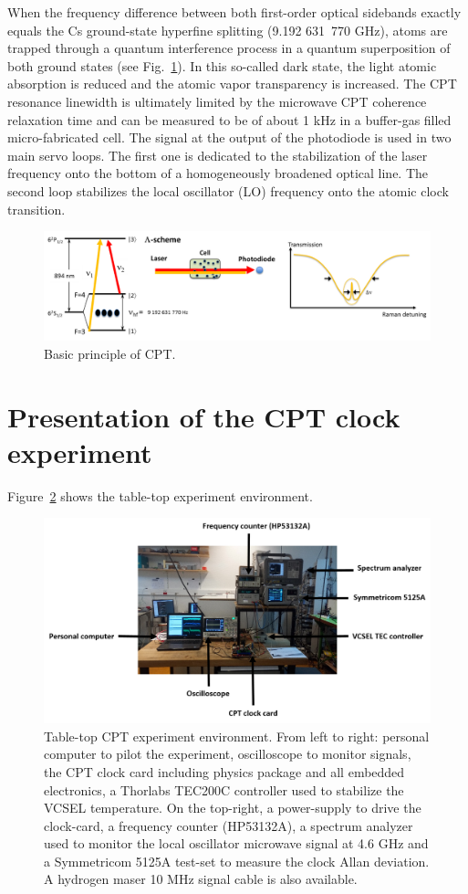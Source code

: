 \documentclass[a4paper,11pt]{article}
\begin{document}
When the frequency difference between both first-order optical sidebands exactly equals the Cs ground-state hyperfine splitting (9.192 631 770 GHz), atoms are trapped through a quantum interference process in a quantum superposition of both ground states (see Fig.~\ref{fig:ppeCPT}). In this so-called dark state, the light atomic absorption is reduced and the atomic vapor transparency is increased. The CPT resonance linewidth is ultimately limited by the microwave CPT coherence relaxation time and can be measured to be of about 1 kHz in a buffer-gas filled micro-fabricated cell. The signal at the output of the photodiode is used in two main servo loops. The first one is dedicated to the stabilization of the laser frequency onto the bottom of a homogeneously broadened optical line. The second loop stabilizes the local oscillator (LO) frequency onto the atomic clock transition.

\begin{figure}[h!]
	\centering
	\includegraphics[width=0.9\linewidth]{ppeCPT}
	\caption{Basic principle of CPT.}
	\label{fig:ppeCPT}
\end{figure}


\section{Presentation of the CPT clock experiment}
Figure~\ref{fig:environnement} shows the table-top experiment environment.

\begin{figure}[h!]
	\centering
	\includegraphics[width=0.9\linewidth]{environnement}
	\caption{Table-top CPT experiment environment. From left to right: personal computer to pilot the experiment, 		oscilloscope to monitor signals, the CPT clock card including physics package and all embedded electronics, a Thorlabs 		TEC200C controller used to stabilize the VCSEL temperature. On the top-right, a power-supply to drive the clock-card, 		a frequency counter (HP53132A), a spectrum analyzer used to monitor the local oscillator microwave signal at 4.6 GHz 		and a Symmetricom 5125A test-set to measure the clock Allan deviation. A hydrogen maser 10 MHz signal cable is also 		available.}
	\label{fig:environnement}
\end{figure}
\end{document}
